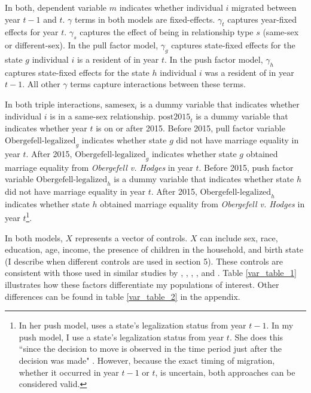 \documentclass[12pt,letterpaper]{article}
\begin{document}
In both, dependent variable $m$ indicates whether individual $i$ migrated between year $t-1$ and $t$. $\gamma$ terms in both models are fixed-effects. $\gamma_t$ captures year-fixed effects for year $t$. $\gamma_s$ captures the effect of being in relationship type $s$ (same-sex or different-sex). In the pull factor model, $\gamma_g$ captures state-fixed effects for the state $g$ individual $i$ is a resident of in year $t$. In the push factor model, $\gamma_h$ captures state-fixed effects for the state $h$ individual $i$ was a resident of in year $t-1$. All other $\gamma$ terms capture interactions between these terms. 

In both triple interactions, $\text{samesex}_i$ is a dummy variable that indicates whether individual $i$ is in a same-sex relationship. $\text{post2015}_t$ is a dummy variable that indicates whether year $t$ is on or after 2015. Before 2015, pull factor variable $\text{Obergefell-legalized}_g$ indicates whether state $g$ did not have marriage equality in year $t$. After 2015, $\text{Obergefell-legalized}_g$ indicates whether state $g$ obtained marriage equality from \textit{Obergefell v. Hodges} in year $t$. Before 2015, push factor variable $\text{Obergefell-legalized}_h$ is a dummy variable that indicates whether state $h$ did not have marriage equality in year $t$. After 2015, $\text{Obergefell-legalized}_h$ indicates whether state $h$ obtained marriage equality from \textit{Obergefell v. Hodges} in year $t$\footnote{In her push model, \citet{12} uses a state's legalization status from year $t-1$. In my push model, I use a state's legalization status from year $t$. She does this ``since the decision to move is observed in the time
period just after the decision was made" \citep[2959]{12}. However, because the exact timing of migration, whether it occurred in year $t-1$ or $t$, is uncertain, both approaches can be considered valid.}.

In both models, $X$ represents a vector of controls. $X$ can include sex, race, education, age, income, the presence of children in the household, and birth state (I describe when different controls are used in section 5). These controls are consistent with those used in similar studies by \citet{1}, \citet{3}, \citet{5}, \citet{7}, and \citet{12}. Table \ref{var_table_1} illustrates how these factors differentiate my populations of interest. Other differences can be found in table \ref{var_table_2} in the appendix.


\end{document}
